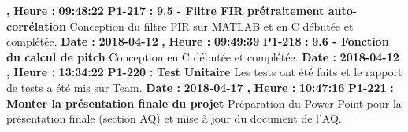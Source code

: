 \documentclass{article}%
\begin{document}
\textbf{,}%
\textbf{ Heure : }%
\textbf{09:48:22}%
\newline%
%
\textbf{P1{-}217 }%
\textbf{ : }%
\textbf{ 9.5 {-} Filtre FIR prétraitement auto{-}corrélation}%
\newline%
\newline%
%
Conception du filtre FIR sur MATLAB et en C débutée et complétée.\newline%
\newline%
%
\textbf{Date : }%
\textbf{2018{-}04{-}12}%
\textbf{,}%
\textbf{ Heure : }%
\textbf{09:49:39}%
\newline%
%
\textbf{P1{-}218 }%
\textbf{ : }%
\textbf{ 9.6 {-} Fonction du calcul de pitch}%
\newline%
\newline%
%
Conception en C débutée et complétée.\newline%
\newline%
%
\textbf{Date : }%
\textbf{2018{-}04{-}12}%
\textbf{,}%
\textbf{ Heure : }%
\textbf{13:34:22}%
\newline%
%
\textbf{P1{-}220 }%
\textbf{ : }%
\textbf{ Test Unitaire}%
\newline%
\newline%
%
Les tests ont été faits et le rapport de tests a été mis sur Team.\newline%
\newline%
%
\textbf{Date : }%
\textbf{2018{-}04{-}17}%
\textbf{,}%
\textbf{ Heure : }%
\textbf{10:47:16}%
\newline%
%
\textbf{P1{-}221 }%
\textbf{ : }%
\textbf{ Monter la présentation finale du projet }%
\newline%
\newline%
%
Préparation du Power Point pour la présentation finale (section AQ) et mise à jour du document de l'AQ.\newline%
\newline%
%
\newpage

%
\end{document}
